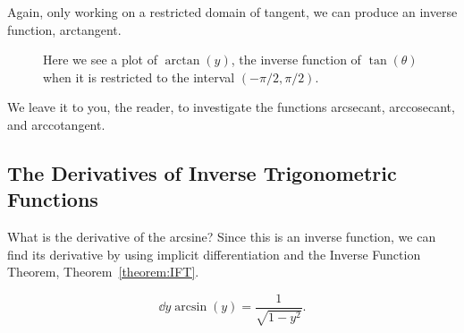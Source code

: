 Again, only working on a restricted domain of tangent, we can produce an inverse function, arctangent. 
\begin{fullwidth}
\begin{figure*}[!h]
\caption{Here we see a plot of $\arctan(y)$, the inverse function of
$\tan(\theta)$ when it is restricted to the interval $(-\pi/2,\pi/2)$.}
\end{figure*}
\end{fullwidth}

We leave it to you, the reader, to investigate the functions
arcsecant, arccosecant, and arccotangent.


\subsection*{The Derivatives of Inverse Trigonometric Functions}

What is the derivative of the arcsine? Since this is an inverse
function, we can find its derivative by using implicit
differentiation and the Inverse Function Theorem, Theorem~\ref{theorem:IFT}.


\begin{theorem}
\[
\dd{y} \arcsin(y) = \frac{1}{\sqrt{1-y^2}}.
\]
\end{theorem}

